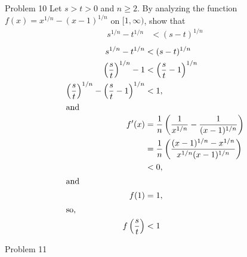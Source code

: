 \documentclass[8pt]{extarticle}
\begin{document}
  \begin{problem}{Problem 10}
    Let $s > t > 0$ and $n \geq 2$. By analyzing the function $f(x) = x^{1/n} - (x-1)^{1/n}$ on $[1,\infty)$, show that
    \begin{align*}
      s^{1/n} - t^{1/n} &< (s-t)^{1/n}
    \end{align*}
    \tcblower
    \begin{align*}
      s^{1/n} - t^{1/n} &< (s-t)^{1/n}\\
      \left(\frac{s}{t}\right)^{1/n}-1 &< \left(\frac{s}{t}-1\right)^{1/n}\\
      \left(\frac{s}{t}\right)^{1/n}-\left(\frac{s}{t}-1\right)^{1/n} &< 1,\\
      \shortintertext{and}
      f'(x) &= \frac{1}{n}\left(\frac{1}{x^{1/n}}-\frac{1}{(x-1)^{1/n}}\right)\\
            &= \frac{1}{n}\left(\frac{(x-1)^{1/n}-x^{1/n}}{x^{1/n}(x-1)^{1/n}}\right)\\
            &< 0,\\
            \shortintertext{and}
      f(1) &= 1,\\
      \shortintertext{so,}
      f\left(\frac{s}{t}\right)&< 1
    \end{align*}
  \end{problem}
  \begin{problem}{Problem 11}
    
  \end{problem}
\end{document}
